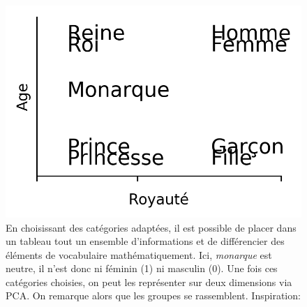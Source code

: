 \begin{figure}[h]
    \centering
    \noindent\begin{minipage}{.45\linewidth}
    \end{minipage}
    \begin{minipage}{.45\linewidth}
        \includegraphics[width=\linewidth]{results/deep-learning/explanations/visualisation_embedding.png}
    \end{minipage}
    \caption{En choisissant des catégories adaptées, il est possible de placer dans un tableau tout un ensemble d'informations et de différencier des éléments de vocabulaire mathématiquement. Ici, \textit{monarque} est neutre, il n'est donc ni féminin (1) ni masculin (0). Une fois ces catégories choisies, on peut les représenter sur deux dimensions via PCA. On remarque alors que les groupes se rassemblent. Inspiration: \cite{lynn_get_2018}}
    \label{figure:deep-learning:projection-embedding}
\end{figure}